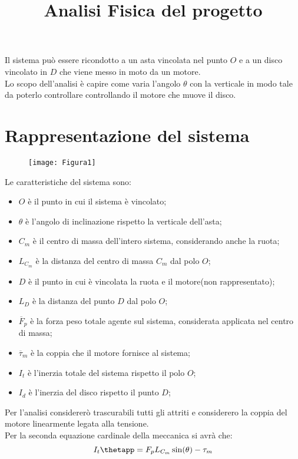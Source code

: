 \documentclass[12pt,a4paper,twoside, openright]{scrartcl}
\title{Analisi Fisica del progetto}
\date{\vspace{-5ex}}
\begin{document}
	\pagestyle{plain}
	\maketitle
	Il sistema può essere ricondotto a un asta vincolata nel punto  $O$ e a un disco vincolato in $D$ che viene messo in moto da un motore.\\ 
	Lo scopo dell'analisi è capire come varia l'angolo $\theta$ con la verticale in modo tale da poterlo controllare controllando il motore che muove il disco.
	\section{Rappresentazione del sistema}
		\begin{figure}[H]
			\begin{center}
			\texttt{[image: Figura1]}
			\end{center}
			\label{fig:struttura}
		\end{figure}
	Le caratteristiche del sistema sono:
	\begin{itemize}
	\item $O$ è il punto in cui il sistema è vincolato;
	\item $\theta$ è l'angolo di inclinazione rispetto la verticale dell'asta;
	\item $C_m$ è il centro di massa dell'intero sistema, considerando anche la ruota;
	\item $L_{C_m}$ è la distanza del centro di massa $C_m$ dal polo $O$; 
	\item $D$ è il punto in cui è vincolata la ruota e il motore(non rappresentato);
	\item $L_D$ è la distanza del punto $D$ dal polo $O$; 
	\item $\overline{F}_p$ è la forza peso totale agente sul sistema, considerata applicata nel centro di massa;
	\item $ \overline{\tau}_m$ è la coppia che il motore fornisce al sistema;
	\item $I_t$ è l'inerzia totale del sistema rispetto il polo $O$;
	\item $I_d$ è l'inerzia del disco rispetto il punto $D$;
	\end{itemize}
	Per l'analisi considererò trascurabili tutti gli attriti e considerero la coppia del motore linearmente legata alla tensione.\\
	Per la seconda equazione cardinale della meccanica si avrà che:
	\begin{equation}
	\label{eqn:1}
	I_t\thetapp=F_p L_{C_m}\sin(\theta)- \tau_m
	\end{equation}
\end{document}
